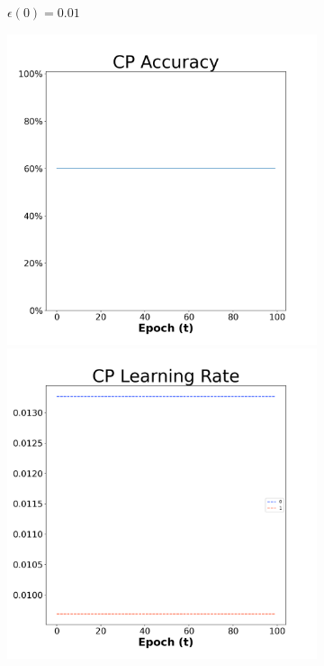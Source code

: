 \begin{figure}[H]
\begin{subfigure}{0.3\textwidth}
\caption{$\epsilon(0)=0.01$}
\end{subfigure}\hfil %
\begin{subfigure}{0.3\textwidth}
\includegraphics[width=\linewidth]{images/exper1/NSP/CP_0.03_acc.png}
\includegraphics[width=\linewidth]{images/exper1/NSP/CP_0.03_lr.png}

\end{subfigure}
\end{figure}

